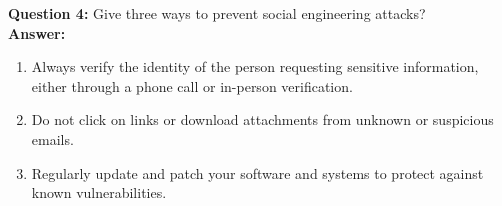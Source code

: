\documentclass{article}
\begin{document}
\vspace{1\baselineskip}

\textbf{Question 4: } Give three ways to prevent social engineering attacks? \\
\textbf{Answer: }
\begin{enumerate}
    \item Always verify the identity of the person requesting sensitive information, either through a phone call or in-person verification.
    \item Do not click on links or download attachments from unknown or suspicious emails.
    \item Regularly update and patch your software and systems to protect against known vulnerabilities.
\end{enumerate}
\end{document}
